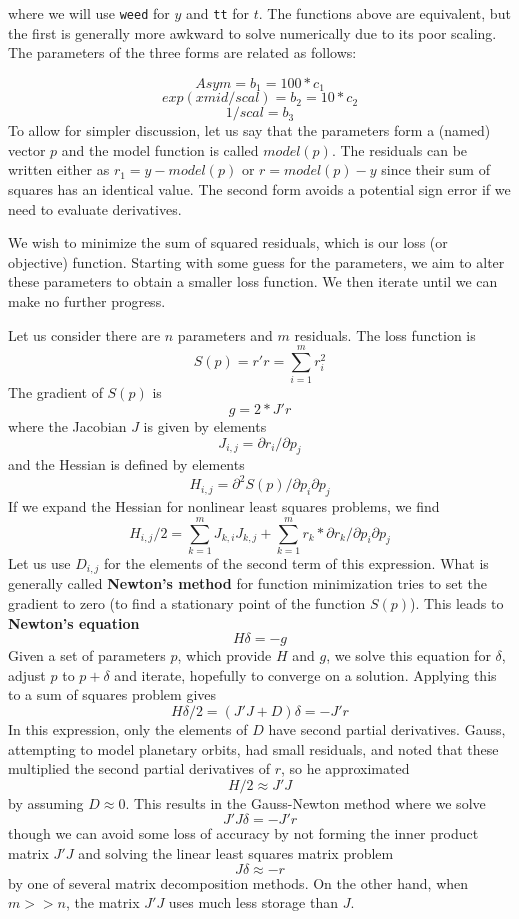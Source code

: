 where we will use \texttt{weed} for \(y\) and \texttt{tt} for \(t\).
The functions above are equivalent, but the first is generally more awkward
to solve numerically due to its poor scaling. The parameters of the three forms
are related as follows:

\[   Asym =  b_1 = 100 * c_1 \]
\[ exp(xmid/scal)  =  b_2 = 10 * c_2 \]
\[ 1/scal  =  b_3 \]
To allow for simpler discussion, let us say that the parameters form a (named) vector
\(p\) and the model function is called \(model(p)\). The residuals can be written
either as \(r_1 = y - model(p)\) or \(r = model(p) - y\)
since their sum of squares has an identical value. The second form
avoids a potential sign error if we need to evaluate derivatives.

We wish to minimize the sum of squared residuals, which is our loss (or objective) function.
Starting with some guess for the parameters, we aim to alter these parameters to obtain a smaller
loss function. We then iterate until we can make no further progress.

Let us consider there are \(n\) parameters and \(m\) residuals.
The loss function is
\[ S(p) = r' r = \sum_{i=1}^m { r_i^2 }\]
The gradient of \(S(p)\) is
\[ g = 2 * J' r\]
where the Jacobian \(J\) is given by elements
\[ J_{i,j} = \partial r_i / \partial p_j \]
and the Hessian is defined by elements
\[ H_{i,j} = \partial ^2 S(p) / {\partial p_i \partial p_j} \]
If we expand the Hessian for nonlinear least squares problems, we find
\[  H_{i,j}/2 = \sum_{k = 1}^m{ J_{k,i} J_{k,j}}  + \sum_{k = 1}^m {r_k * \partial{r_k}/{\partial p_i \partial p_j}}\]
Let us use \(D_{i,j}\) for the elements of the second term of this expression.
What is generally called \textbf{Newton's method} for function minimization tries
to set the gradient to zero (to find a stationary point of the function \(S(p)\)).
This leads to \textbf{Newton's equation}
\[ H \delta  = -g \]
Given a set of parameters \(p\), which provide \(H\) and \(g\), we solve this equation for \(\delta\), adjust \(p\)
to \(p + \delta\) and iterate, hopefully to converge on a solution.
Applying this to a sum of squares problem gives
\[ H \delta / 2 = (J'J + D) \delta = - J' r\]
In this expression, only the elements of \(D\) have second partial derivatives.
Gauss, attempting to model planetary orbits, had small residuals, and noted
that these multiplied the second partial derivatives of \(r\), so he approximated
\[ H / 2 \approx J' J\]
by assuming \(D \approx 0\). This results in the Gauss-Newton method where we
solve
\[ J' J \delta = - J' r\]
though we can avoid some loss of accuracy by not forming the inner product matrix
\(J' J\) and solving the linear least squares matrix problem
\[ J \delta \approx -r \]
by one of several matrix decomposition methods. On the other hand, when \(m >> n\),
the matrix \(J' J\) uses much less storage than \(J\).

